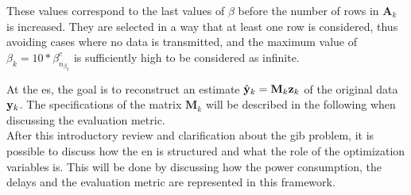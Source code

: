 These values correspond to the last values of $\beta$ before the number of rows in $\mathbf{A}_k$ is increased. They are selected in a way that at least one row is considered, thus avoiding cases where no data is transmitted, and the maximum value of $\beta_k= 10*\beta_{n_{\beta_k}}^c$ is sufficiently high to be considered as infinite.\

At the \gls{es}, the goal is to reconstruct an estimate $\hat{\mathbf{y}}_k=\mathbf{M}_k\mathbf{z}_k$ of the original data $\mathbf{y}_k$. The specifications of the matrix $\mathbf{M}_k$ will be described in the following when discussing the evaluation metric.\\

After this introductory review and clarification about the \gls{gib} problem, it is possible to discuss how the \gls{en} is structured and what the role of the optimization variables is. This will be done by discussing how the power consumption, the delays and the evaluation metric are represented in this framework.\

